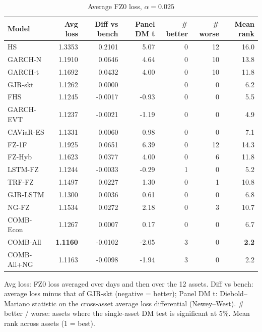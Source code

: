 \begin{table}[htbp]
\centering
\footnotesize
\caption{Average FZ0 loss, $\alpha=0.025$}
\label{tab:loss_a025}
\begin{tabular}{lrrrrrr}
\toprule
Model & Avg loss & Diff vs bench & Panel DM t & \# better & \# worse & Mean rank \\
\midrule
HS & 1.3353 & 0.2101 & 5.07 & 0 & 12 & 16.0 \\
GARCH-N & 1.1910 & 0.0646 & 4.64 & 0 & 10 & 13.8 \\
GARCH-t & 1.1692 & 0.0432 & 4.00 & 0 & 10 & 11.8 \\
GJR-skt & 1.1262 & 0.0000 &  & 0 & 0 & 6.2 \\
FHS & 1.1245 & -0.0017 & -0.93 & 0 & 0 & 5.5 \\
GARCH-EVT & 1.1237 & -0.0021 & -1.19 & 0 & 0 & 4.9 \\
CAViaR-ES & 1.1331 & 0.0060 & 0.98 & 0 & 0 & 7.1 \\
FZ-1F & 1.1925 & 0.0651 & 6.39 & 0 & 12 & 14.3 \\
FZ-Hyb & 1.1623 & 0.0377 & 4.00 & 0 & 6 & 11.8 \\
LSTM-FZ & 1.1244 & -0.0033 & -0.29 & 1 & 0 & 5.2 \\
TRF-FZ & 1.1497 & 0.0227 & 1.30 & 0 & 1 & 10.8 \\
GJR-LSTM & 1.1300 & 0.0036 & 0.61 & 0 & 0 & 6.8 \\
NG-FZ & 1.1534 & 0.0272 & 2.18 & 0 & 3 & 10.7 \\
COMB-Econ & 1.1267 & 0.0007 & 0.17 & 0 & 0 & 6.7 \\
COMB-All & \textbf{1.1160} & -0.0102 & -2.05 & 3 & 0 & \textbf{2.2} \\
COMB-All+NG & 1.1163 & -0.0098 & -1.94 & 3 & 0 & 2.2 \\
\bottomrule
\end{tabular}
\par\smallskip\parbox{\linewidth}{\scriptsize Avg loss: FZ0 loss averaged over days and then over the 12 assets. Diff vs bench: average loss minus that of GJR-skt (negative = better); Panel DM t: Diebold--Mariano statistic on the cross-asset average loss differential (Newey--West). \# better / worse: assets where the single-asset DM test is significant at 5\%. Mean rank across assets (1 = best).}
\end{table}